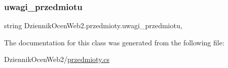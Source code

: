 \subsubsection{\texorpdfstring{uwagi\+\_\+przedmiotu}{uwagi\_przedmiotu}}
{\footnotesize\ttfamily string Dziennik\+Ocen\+Web2.\+przedmioty.\+uwagi\+\_\+przedmiotu\hspace{0.3cm}{\ttfamily [get]}, {\ttfamily [set]}}



The documentation for this class was generated from the following file\+:\begin{DoxyCompactItemize}
\item 
Dziennik\+Ocen\+Web2/\hyperlink{przedmioty_8cs}{przedmioty.\+cs}\end{DoxyCompactItemize}
